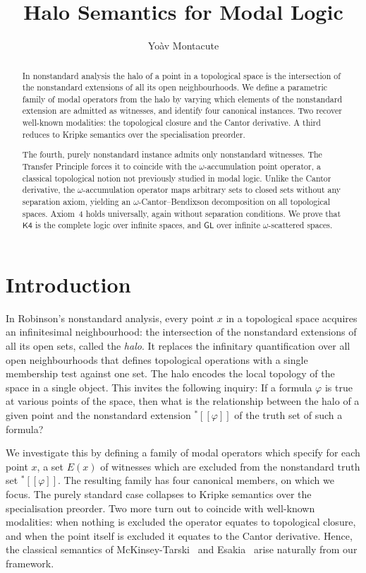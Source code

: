 \documentclass[submission,copyright,creativecommons]{eptcs}
\title{Halo Semantics for Modal Logic}
\author{Yo\`av Montacute
\institute{National Institute of Informatics \\ Tokyo, Japan}
\email{montacute@nii.ac.jp}}
\newcommand{\sem}[1]{[\![#1]\!]}
\newcommand{\str}{{{}^{*}\!}}
\begin{document}
\maketitle

\begin{abstract}
    In nonstandard analysis the halo of a point in a topological space 
is the intersection of the nonstandard extensions of all its open neighbourhoods.
We define a parametric family of modal operators from the halo by varying which elements of the nonstandard extension are admitted as witnesses, and identify four canonical instances.
Two recover well-known modalities: the topological closure and the Cantor derivative.
A third reduces to Kripke semantics over the specialisation preorder.

The fourth, purely nonstandard instance admits only nonstandard witnesses.
The Transfer Principle forces it to coincide with the $\omega$-accumulation point operator, a classical topological notion not previously studied in modal logic.
Unlike the Cantor derivative, the $\omega$-accumulation operator maps arbitrary sets to closed sets without any separation axiom, yielding an $\omega$-Cantor--Bendixson decomposition on all topological spaces.
Axiom~4 holds universally, again without separation conditions.
We prove that $\mathsf{K4}$ is the complete logic over infinite spaces, and $\mathsf{GL}$ over infinite $\omega$-scattered spaces.
\end{abstract}


\section{Introduction}

In Robinson's nonstandard analysis, every point $x$ in a topological space acquires an infinitesimal neighbourhood: the intersection of the nonstandard extensions of all its open sets, called the \emph{halo}.
It replaces the infinitary quantification over all open neighbourhoods that defines topological operations with a single membership test against one set.
The halo encodes the local topology of the space in a single object.
This invites the following inquiry: 
If a formula $\varphi$ is true at various points of the space, then what is the relationship between the halo of a given point and the nonstandard extension $\str\sem{\varphi}$ of the truth set of such a formula?

We investigate this by defining a family of modal operators which specify for each point $x$, a set $E(x)$ of witnesses which are excluded from the nonstandard truth set $\str\sem{\varphi}$.
The resulting family has four canonical members, on which we focus.
The purely standard case collapses to Kripke semantics over the specialisation preorder.
Two more turn out to coincide with well-known modalities: when nothing is excluded the operator equates to topological closure, and when the point itself is excluded it equates to the Cantor derivative.
Hence, the classical semantics of McKinsey-Tarski~\cite{McKinseyTarski1944} and 
Esakia~\cite{Esakia1981} arise naturally from our framework. 
\end{document}
